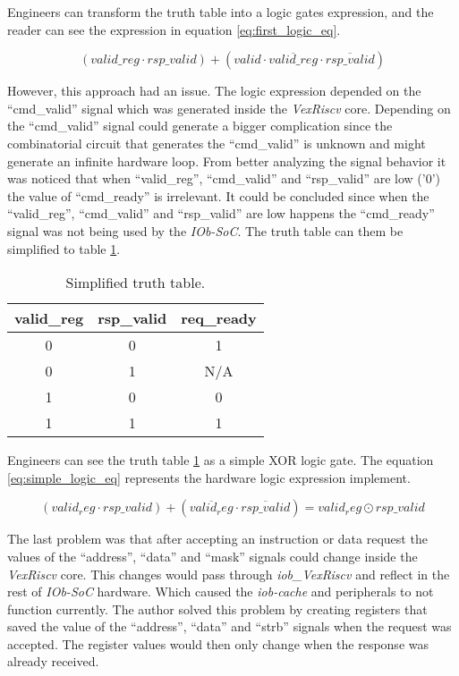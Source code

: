 Engineers can transform the truth table into a logic gates expression, and the reader can see the expression in equation \ref{eq:first_logic_eq}.

\begin{equation}
  (valid\_reg \cdot rsp\_valid) + (valid \cdot \overline{valid\_reg} \cdot \overline{rsp\_valid})
  \label{eq:first_logic_eq}
\end{equation}

However, this approach had an issue. The logic expression depended on the \enquote{cmd\_valid} signal which was generated inside the \textit{VexRiscv} core. Depending on the \enquote{cmd\_valid} signal could generate a bigger complication since the combinatorial circuit that generates the \enquote{cmd\_valid} is unknown and might generate an infinite hardware loop. From better analyzing the signal behavior it was noticed that when \enquote{valid\_reg}, \enquote{cmd\_valid} and \enquote{rsp\_valid} are low ('0') the value of \enquote{cmd\_ready} is irrelevant. It could be concluded since when the \enquote{valid\_reg}, \enquote{cmd\_valid} and \enquote{rsp\_valid} are low happens the \enquote{cmd\_ready} signal was not being used by the \textit{IOb-SoC}. The truth table can them be simplified to table \ref{tab:simple_truth_table}.

\begin{table}[!ht]
  \centering
  \begin{tabular}{cc|c}
  valid\_reg & rsp\_valid & req\_ready \\ \hline
  0          & 0          & 1          \\
  0          & 1          & N/A        \\
  1          & 0          & 0          \\
  1          & 1          & 1         
  \end{tabular}
  \caption{Simplified truth table.}
  \label{tab:simple_truth_table}
\end{table}

Engineers can see the truth table \ref{tab:simple_truth_table} as a simple XOR logic gate. The equation \ref{eq:simple_logic_eq} represents the hardware logic expression implement.

\begin{equation}
  (valid_reg \cdot rsp\_valid) + (\overline{valid_reg} \cdot \overline{rsp\_valid}) = valid_reg \odot rsp\_valid
  \label{eq:simple_logic_eq}
\end{equation}

The last problem was that after accepting an instruction or data request the values of the \enquote{address}, \enquote{data} and \enquote{mask} signals could change inside the \textit{VexRiscv} core. This changes would pass through \textit{iob\_VexRiscv} and reflect in the rest of \textit{IOb-SoC} hardware. Which caused the \textit{iob-cache} and peripherals to not function currently. The author solved this problem by creating registers that saved the value of the \enquote{address}, \enquote{data} and \enquote{strb} signals when the request was accepted. The register values would then only change when the response was already received.

